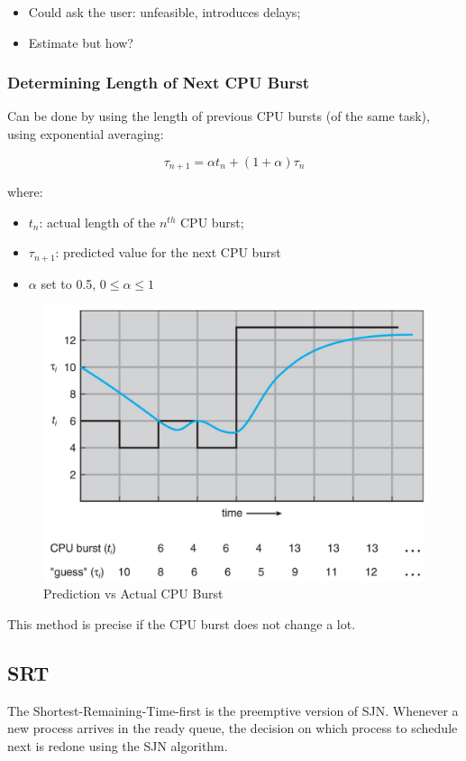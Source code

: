 \begin{itemize}
    \item Could ask the user:  unfeasible, introduces delays;
    \item Estimate but how?
\end{itemize}


\subsubsection{Determining Length of Next CPU Burst}
Can be done by using the length of previous CPU bursts (of the same task), using exponential averaging:

\begin{equation}
    \tau_{n+1} = \alpha t_n + (1+\alpha)\tau_n
\end{equation}

where:
\begin{itemize}
    \item $t_n$: actual length of the $n^{th}$ CPU burst;
    \item $\tau_{n+1}$: predicted value for the next CPU burst
    \item $\alpha$ set to 0.5, $ 0 \leq \alpha \leq 1$ 
\end{itemize}

\newpage

\begin{figure}[htbp]
    \centering
    \includegraphics[width=0.55\linewidth]{img/prediction.png}
    \caption{Prediction vs Actual CPU Burst}    
\end{figure}


This method is precise if the CPU burst does not change a lot.

\subsection{SRT}

The Shortest-Remaining-Time-first is the preemptive version of SJN. Whenever a new process arrives in the ready queue, the
decision on which process to schedule next is redone using the SJN algorithm.

